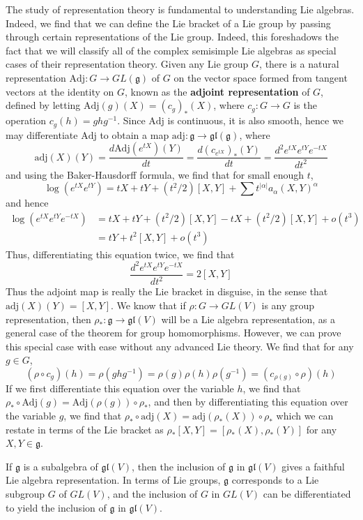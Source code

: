 The study of representation theory is fundamental to understanding Lie algebras. Indeed, we find that we can define the Lie bracket of a Lie group by passing through certain representations of the Lie group. Indeed, this foreshadows the fact that we will classify all of the complex semisimple Lie algebras as special cases of their representation theory. Given any Lie group $G$, there is a natural representation $\text{Adj}: G \to GL(\mathfrak{g})$ of $G$ on the vector space formed from tangent vectors at the identity on $G$, known as the {\bf adjoint representation} of $G$, defined by letting $\text{Adj}(g)(X) = (c_g)_*(X)$, where $c_g: G \to G$ is the operation $c_g(h) = ghg^{-1}$. Since $\text{Adj}$ is continuous, it is also smooth, hence we may differentiate $\text{Adj}$ to obtain a map $\text{adj}: \mathfrak{g} \to \mathfrak{gl}(\mathfrak{g})$, where
%
\[ \text{adj}(X)(Y) = \frac{d\text{Adj}(e^{tX})(Y)}{dt} = \frac{d(c_{e^{tX}})_*(Y)}{dt} = \frac{d^2 e^{tX} e^{tY} e^{-tX}}{dt^2} \]
%
and using the Baker-Hausdorff formula, we find that for small enough $t$,
%
\[ \log(e^{tX} e^{tY}) = tX + tY + (t^2/2)[X,Y] + \sum t^{|\alpha|} a_\alpha (X,Y)^\alpha \]
%
and hence
%
\begin{align*}
    \log(e^{tX} e^{tY} e^{-tX}) &= tX + tY + (t^2/2)[X,Y] - tX + (t^2/2)[X,Y] + o(t^3)\\
    &= tY + t^2[X,Y] + o(t^3)
\end{align*}
%
Thus, differentiating this equation twice, we find that
%
\[ \frac{d^2 e^{tX} e^{tY} e^{-tX}}{dt^2} = 2[X,Y] \]
%
Thus the adjoint map is really the Lie bracket in disguise, in the sense that $\text{adj}(X)(Y) = [X,Y]$. We know that if $\rho: G \to GL(V)$ is any group representation, then $\rho_*: \mathfrak{g} \to \mathfrak{gl}(V)$ will be a Lie algebra representation, as a general case of the theorem for group homomorphisms. However, we can prove this special case with ease without any advanced Lie theory. We find that for any $g \in G$,
%
\[ (\rho \circ c_g)(h) = \rho(ghg^{-1}) = \rho(g) \rho(h) \rho(g^{-1}) = (c_{\rho(g)} \circ \rho)(h) \]
%
If we first differentiate this equation over the variable $h$, we find that $\rho_* \circ \text{Adj}(g) = \text{Adj}(\rho(g)) \circ \rho_*$, and then by differentiating this equation over the variable $g$, we find that $\rho_* \circ \text{adj}(X) = \text{adj}(\rho_*(X)) \circ \rho_*$ which we can restate in terms of the Lie bracket as $\rho_*[X,Y] = [\rho_*(X), \rho_*(Y)]$ for any $X,Y \in \mathfrak{g}$.

\begin{example}
    If $\mathfrak{g}$ is a subalgebra of $\mathfrak{gl}(V)$, then the inclusion of $\mathfrak{g}$ in $\mathfrak{gl}(V)$ gives a faithful Lie algebra representation. In terms of Lie groups, $\mathfrak{g}$ corresponds to a Lie subgroup $G$ of $GL(V)$, and the inclusion of $G$ in $GL(V)$ can be differentiated to yield the inclusion of $\mathfrak{g}$ in $\mathfrak{gl}(V)$.
\end{example}

